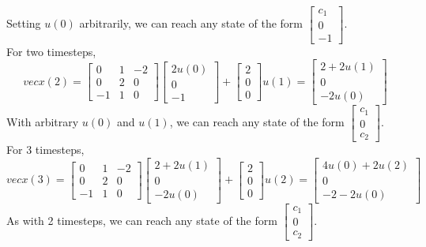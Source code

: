 \begin{enumerate}
{        Setting $u(0)$ arbitrarily, we can reach any state of the form $\begin{bmatrix} c_1 \\ 0 \\ -1\end{bmatrix}$. \\
        \newline
        For two timesteps,
        \[vec{x}(2) = 
        \begin{bmatrix}
            0 & 1 & -2 \\
            0 & 2 & 0 \\
            -1 & 1 & 0
        \end{bmatrix} 
        \begin{bmatrix} 
            2u(0) \\ 0 \\ -1
        \end{bmatrix}
        + \begin{bmatrix}
            2 \\ 0 \\ 0
        \end{bmatrix} u(1) = 
        \begin{bmatrix} 
            2 + 2u(1) \\ 0 \\ -2u(0)
        \end{bmatrix}\]
        With arbitrary $u(0)$ and $u(1)$, we can reach any state of the form $\begin{bmatrix} c_1 \\ 0 \\ c_2 \end{bmatrix}$. \\
        \newline
        For 3 timesteps,
        \[vec{x}(3) = 
        \begin{bmatrix}
            0 & 1 & -2 \\
            0 & 2 & 0 \\
            -1 & 1 & 0
        \end{bmatrix} 
        \begin{bmatrix} 
            2 + 2u(1) \\ 0 \\ -2u(0)
        \end{bmatrix}
        + \begin{bmatrix}
            2 \\ 0 \\ 0
        \end{bmatrix} u(2) = 
        \begin{bmatrix} 
            4u(0) + 2u(2) \\ 0 \\ -2 - 2u(0)
        \end{bmatrix}\]
        As with 2 timesteps, we can reach any state of the form $\begin{bmatrix} c_1 \\ 0 \\ c_2 \end{bmatrix}$.
    }


\end{enumerate}
